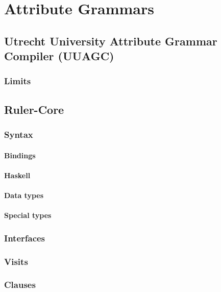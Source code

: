 \chapter{Attribute Grammars}

\section{Utrecht University Attribute Grammar Compiler (UUAGC)}

\subsection{Limits}


\section{Ruler-Core}

\subsection{Syntax}

\subsubsection{Bindings}

\subsubsection{Haskell}

\subsubsection{Data types}

\subsubsection{Special types}

\subsection{Interfaces}

\subsection{Visits}

\subsection{Clauses}

